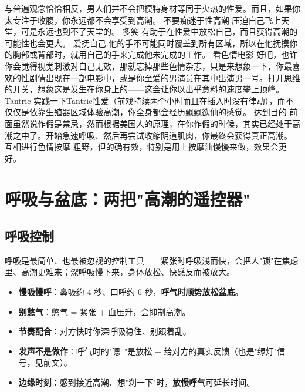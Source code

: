 \documentclass[12pt,UTF8,openany]{ctexbook}
\begin{document}
与普遍观念恰恰相反，男人们并不会把模特身材等同于火热的性爱。而且，如果你太专注于收腹，你永远都不会享受到高潮。
不要痴迷于性高潮
压迫自己飞上天堂，可是永远也到不了天堂的。
多笑
有助于在性爱中放松自己，而且获得高潮的可能性也会更大。
爱抚自己
他的手不可能同时覆盖到所有区域，所以在他抚摸你的胸部或背部时，就用自己的手来完成他未完成的工作。
看色情电影
好吧，也许你会觉得视觉刺激对自己无效，那就忘掉那些色情杂志，只是来想象一下，你最喜欢的性剧情出现在一部电影中，或是你至爱的男演员在其中出演男一号。打开思维的开关，想象这是发生在你身上的——这会让你以出乎意料的速度攀上顶峰。
Tantric
实践一下Tantric性爱（前戏持续两个小时而且在插入时没有律动），而不仅仅是依靠生殖器区域体验高潮，你全身都会经历飘飘欲仙的感觉。
达到目的
前面虽然说作假是禁忌，然而根据美国人的原理，在你作假的时候，其实已经处于高潮之中了。开始急速呼吸、然后再尝试收缩阴道肌肉，你最终会获得真正高潮。
互相进行色情按摩
粗野，但的确有效，特别是用上按摩油慢慢来做，效果会更好。

\section{呼吸与盆底：两把"高潮的遥控器"}

\subsection*{呼吸控制}
呼吸是最简单、也最被忽视的控制工具——紧张时呼吸浅而快，会把人"锁"在焦虑里、高潮更难来；深呼吸慢下来，身体放松、快感反而被放大。
\begin{itemize}[leftmargin=2em,itemsep=0.2em]
  \item \textbf{慢吸慢呼}：鼻吸约 4 秒、口呼约 6 秒，\textbf{呼气时顺势放松盆底}。
  \item \textbf{别憋气}：憋气 = 紧张 + 血压升，会抑制高潮。
  \item \textbf{节奏配合}：对方快时你深呼吸稳住、别跟着乱。
  \item \textbf{发声不是做作}：呼气时的"嗯~"是放松 + 给对方的真实反馈（也是"绿灯"信号，见前文）。
  \item \textbf{边缘时刻}：感到接近高潮、想"刹一下"时，\textbf{放慢呼气}可延长时间。
\end{itemize}
\end{document}
